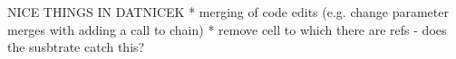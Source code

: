\documentclass[sigconf,anonymous,screen]{acmart}
\begin{document}
NICE THINGS IN DATNICEK
* merging of code edits (e.g. change parameter merges with adding a call to chain)
* remove cell to which there are refs - does the susbtrate catch this?

\end{document}
